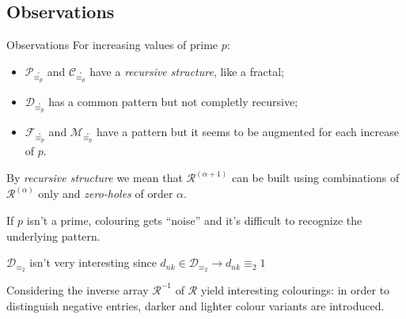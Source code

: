 \documentclass[10pt,serif, professionalfont]{beamer}
\begin{document}
\subsection{Observations}

\begin{frame}{Observations}
    For increasing values of prime $p$:
    \begin{itemize} 
        \item $\mathcal{P}_{\stackrel{\circ}{\equiv_{p}}}$ and
            $\mathcal{C}_{\stackrel{\circ}{\equiv_{p}}}$ have a \emph{recursive structure}, 
            like a fractal;
        \item $\mathcal{D}_{\stackrel{\circ}{\equiv_{p}}}$ has a common pattern but
            not completly recursive;
        \item $\mathcal{F}_{\stackrel{\circ}{\equiv_{p}}}$ and
            $\mathcal{M}_{\stackrel{\circ}{\equiv_{p}}}$ have a pattern but it seems
            to be augmented for each increase of $p$. 
    \end{itemize} 
    By \emph{recursive structure} we mean that $\mathcal{R}^{(\alpha+1)}$ can
    be built using combinations of  $\mathcal{R}^{(\alpha)}$ only and \emph{zero-holes}
    of order $\alpha$.

    \pause
    If $p$ isn't a prime, colouring gets ``noise'' and it's difficult
    to recognize the underlying pattern.

    \pause
    $\mathcal{D}_{\equiv_{2}}$ isn't very interesting since
    $d_{nk}\in\mathcal{D}_{\equiv_{2}}\rightarrow d_{nk}\equiv_{2}1$

    \pause
    Considering the inverse array $\mathcal{R}^{-1}$ of $\mathcal{R}$ yield 
    interesting colourings: in order to distinguish negative entries, darker
    and lighter colour variants are introduced.
\end{frame}
\end{document}
